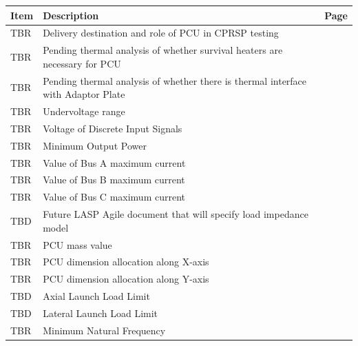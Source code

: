 \documentclass[12pt,oneside,oldfontcommands]{memoir}
\begin{document}
            \clearpage
            \sffamily
            \bfseries
            \normalfont
            \centering
            \begin{table}[htbp]
            \begin{minipage}{\linewidth}
            \setlength{\tymax}{0.5\linewidth}
            \centering
            \small\begin{tabular}{| >{\centering\arraybackslash}m{1.25in}| >{\centering\arraybackslash}m{2.95in}| >{\centering\arraybackslash}m{1.5in}|} \hline
            \bfseries{Item} & \bfseries{Description} & \bfseries{Page}\\
            \hline
            TBR & Delivery destination and role of PCU in CPRSP testing & \pageref{tbx_1}  \\ 
 \hline 
TBR & Pending thermal analysis of whether survival heaters are necessary for PCU & \pageref{tbx_2}  \\ 
 \hline 
TBR & Pending thermal analysis of whether there is thermal interface with Adaptor Plate & \pageref{tbx_3}  \\ 
 \hline 
TBR & Undervoltage range & \pageref{tbx_4}  \\ 
 \hline 
TBR & Voltage of Discrete Input Signals & \pageref{tbx_5}  \\ 
 \hline 
TBR & Minimum Output Power & \pageref{tbx_6}  \\ 
 \hline 
TBR & Value of Bus A maximum current & \pageref{tbx_7}  \\ 
 \hline 
TBR & Value of Bus B maximum current & \pageref{tbx_8}  \\ 
 \hline 
TBR & Value of Bus C maximum current & \pageref{tbx_9}  \\ 
 \hline 
TBD & Future LASP Agile document that will specify load impedance model & \pageref{tbx_10}  \\ 
 \hline 
TBR & PCU mass value & \pageref{tbx_11}  \\ 
 \hline 
TBR & PCU dimension allocation along X-axis & \pageref{tbx_12}  \\ 
 \hline 
TBR & PCU dimension allocation along Y-axis & \pageref{tbx_13}  \\ 
 \hline 
TBD & Axial Launch Load Limit & \pageref{tbx_14}  \\ 
 \hline 
TBD & Lateral Launch Load Limit & \pageref{tbx_15}  \\ 
 \hline 
TBR & Minimum Natural Frequency & \pageref{tbx_16}  \\ 

\end{tabular}
\end{minipage}
\end{table}
\end{document}
